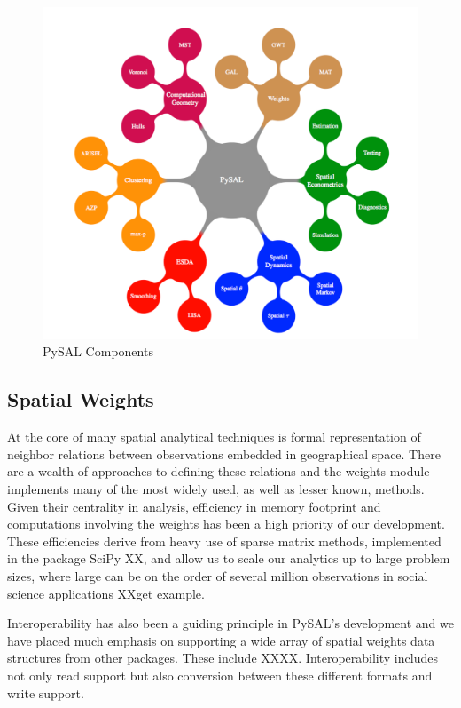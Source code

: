 \documentclass[11pt, titlepage]{article}
\begin{document}
\begin{figure}[ht]
  \begin{center}
    \includegraphics[width=\linewidth]{pysal_components.pdf}
  \end{center}
     \caption{PySAL Components}
     \label{f:pysal}
      \end{figure}      

\subsection{Spatial Weights}

At the core of many spatial analytical techniques is formal
representation of neighbor relations between observations embedded in
geographical space. There are a wealth of approaches to defining these
relations and the weights module implements many of the most widely
used, as well as lesser known, methods. Given their centrality in
analysis, efficiency in memory footprint and computations involving the
weights has been a high priority of our development. These efficiencies
derive from heavy use of sparse matrix methods, implemented in the
package SciPy XX, and allow us to scale our analytics up to large
problem sizes, where large can be on the order of several million
observations in social science applications XXget example.

Interoperability has also been a guiding principle in PySAL's
development and we have placed much emphasis on supporting a wide array
of spatial weights data structures from other packages. These include
XXXX. Interoperability includes not only read support but also
conversion between these different formats and write support.
\end{document}
